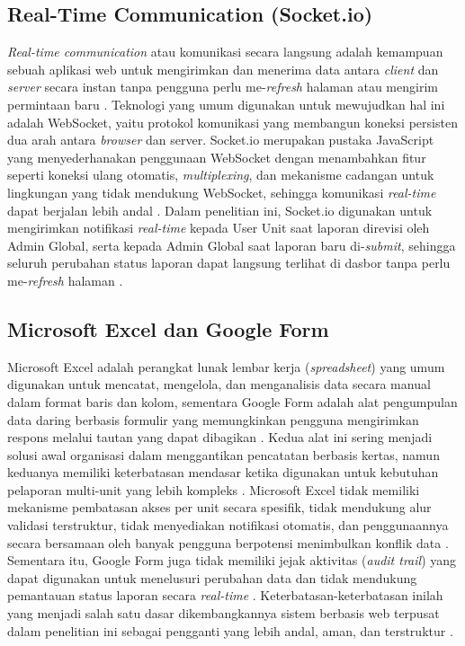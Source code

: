 \subsection{Real-Time Communication (Socket.io)} \label{II.SocketIO}
\textit{Real-time communication} atau komunikasi secara langsung adalah kemampuan sebuah aplikasi web untuk mengirimkan dan menerima data antara \textit{client} dan \textit{server} secara instan tanpa pengguna perlu me-\textit{refresh} halaman atau mengirim permintaan baru \cite{cahyo2026mbg}. Teknologi yang umum digunakan untuk mewujudkan hal ini adalah WebSocket, yaitu protokol komunikasi yang membangun koneksi persisten dua arah antara \textit{browser} dan server. Socket.io merupakan pustaka JavaScript yang menyederhanakan penggunaan WebSocket dengan menambahkan fitur seperti koneksi ulang otomatis, \textit{multiplexing}, dan mekanisme cadangan untuk lingkungan yang tidak mendukung WebSocket, sehingga komunikasi \textit{real-time} dapat berjalan lebih andal \cite{cahyo2026mbg}. Dalam penelitian ini, Socket.io digunakan untuk mengirimkan notifikasi \textit{real-time} kepada User Unit saat laporan direvisi oleh Admin Global, serta kepada Admin Global saat laporan baru di-\textit{submit}, sehingga seluruh perubahan status laporan dapat langsung terlihat di dasbor tanpa perlu me-\textit{refresh} halaman \cite{dani2026pelaporan}. \par

\subsection{Microsoft Excel dan Google Form} \label{II.ExcelGForm}
Microsoft Excel adalah perangkat lunak lembar kerja (\textit{spreadsheet}) yang umum digunakan untuk mencatat, mengelola, dan menganalisis data secara manual dalam format baris dan kolom, sementara Google Form adalah alat pengumpulan data daring berbasis formulir yang memungkinkan pengguna mengirimkan respons melalui tautan yang dapat dibagikan \cite{ningsih2023perbandingan}. Kedua alat ini sering menjadi solusi awal organisasi dalam menggantikan pencatatan berbasis kertas, namun keduanya memiliki keterbatasan mendasar ketika digunakan untuk kebutuhan pelaporan multi-unit yang lebih kompleks \cite{ningsih2023perbandingan}. Microsoft Excel tidak memiliki mekanisme pembatasan akses per unit secara spesifik, tidak mendukung alur validasi terstruktur, tidak menyediakan notifikasi otomatis, dan penggunaannya secara bersamaan oleh banyak pengguna berpotensi menimbulkan konflik data \cite{ningsih2023perbandingan}. Sementara itu, Google Form juga tidak memiliki jejak aktivitas (\textit{audit trail}) yang dapat digunakan untuk menelusuri perubahan data dan tidak mendukung pemantauan status laporan secara \textit{real-time} \cite{ningsih2023perbandingan}. Keterbatasan-keterbatasan inilah yang menjadi salah satu dasar dikembangkannya sistem berbasis web terpusat dalam penelitian ini sebagai pengganti yang lebih andal, aman, dan terstruktur \cite{ningsih2023perbandingan}. \par


